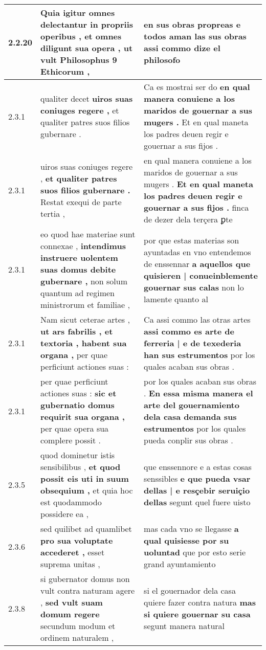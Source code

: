 \begin{tabular}{|p{1cm}|p{6.5cm}|p{6.5cm}|}
2.2.20 & Quia igitur omnes delectantur in propriis operibus , \textbf{ et omnes diligunt sua opera , } ut vult Philosophus 9 Ethicorum , & en sus obras propreas \textbf{ e todos aman las sus obras } assi commo dize el philosofo \\\hline
2.3.1 & qualiter decet \textbf{ uiros suas coniuges regere , } et qualiter patres suos filios gubernare . & Ca es mostrai ser do \textbf{ en qual manera conuiene a los maridos de gouernar a sus mugers . } Et en qual maneta los padres deuen regir e gouernar a sus fijos . \\\hline
2.3.1 & uiros suas coniuges regere , \textbf{ et qualiter patres suos filios gubernare . } Restat exequi de parte tertia , & en qual manera conuiene a los maridos de gouernar a sus mugers . \textbf{ Et en qual maneta los padres deuen regir e gouernar a sus fijos . } finca de dezer dela terçera ꝑte \\\hline
2.3.1 & eo quod hae materiae sunt connexae , \textbf{ intendimus instruere uolentem suas domus debite gubernare , } non solum quantum ad regimen ministrorum et familiae , & por que estas materias son ayuntadas en vno entendemos de enssennar \textbf{ a aquellos que quisieren | conueinblemente gouernar sus calas } non lo lamente quanto al \\\hline
2.3.1 & Nam sicut ceterae artes , \textbf{ ut ars fabrilis , et textoria , habent sua organa , } per quae perficiunt actiones suas : & Ca assi commo las otras artes \textbf{ assi commo es arte de ferreria | e de texederia han sus estrumentos } por los quales acaban sus obras . \\\hline
2.3.1 & per quae perficiunt actiones suas : \textbf{ sic et gubernatio domus requirit sua organa , } per quae opera sua complere possit . & por los quales acaban sus obras . \textbf{ En essa misma manera el arte del gouernamiento dela casa demanda sus estrumentos } por los quales pueda conplir sus obras . \\\hline
2.3.5 & quod dominetur istis sensibilibus , \textbf{ et quod possit eis uti in suum obsequium , } et quia hoc est quodammodo possidere ea , & que enssennore e a estas cosas senssibles \textbf{ e que pueda vsar dellas | e resçebir seruiçio dellas } segunt quel fuere uisto \\\hline
2.3.6 & sed quilibet ad quamlibet \textbf{ pro sua voluptate accederet , } esset suprema unitas , & mas cada vno se llegasse \textbf{ a qual quisiesse por su uoluntad } que por esto serie grand ayuntamiento \\\hline
2.3.8 & si gubernator domus non vult contra naturam agere , \textbf{ sed vult suam domum regere } secundum modum et ordinem naturalem , & si el gouernador dela casa quiere fazer contra natura \textbf{ mas si quiere gouernar su casa } segunt manera natural \\\hline

\end{tabular}
